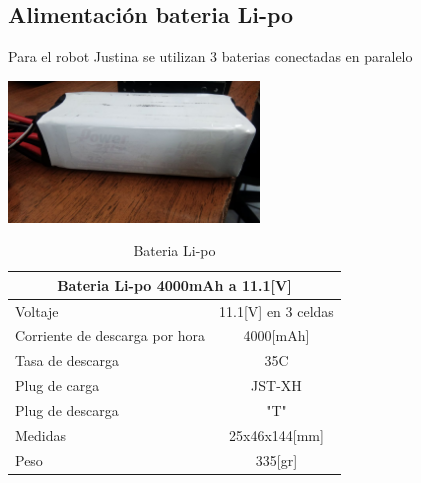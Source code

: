 \documentclass[a4paper]{book}
\begin{document}
\subsection{Alimentación bateria Li-po}

Para el robot Justina se utilizan 3 baterias conectadas en paralelo

\begin{center}
\includegraphics[width=0.5\textwidth]{Figures/Hardware/Partes/Li-po_Battery.jpg}
\label{fig:Hardware:Partes:Battery}
\end{center}

\begin{table}[H]
\begin{center}
\begin{tabular}{|l|l|}%

\hline
\multicolumn{2}{|c|}{Bateria Li-po 4000mAh a 11.1[V]} \\ \hline %
Voltaje &  \multicolumn{1}{|c|}{11.1[V] en 3 celdas}\\ \hline
Corriente de descarga por hora  & \multicolumn{1}{|c|}{4000[mAh]}\\ \hline
Tasa de descarga & \multicolumn{1}{|c|}{35C}\\ \hline
Plug de carga & \multicolumn{1}{|c|}{JST-XH}\\ \hline
Plug de descarga & \multicolumn{1}{|c|}{"T"}\\ \hline
Medidas & \multicolumn{1}{|c|}{25x46x144[mm]}\\ \hline
Peso & \multicolumn{1}{|c|}{335[gr]}\\ \hline

\end{tabular}
\caption{Bateria Li-po}
\label{Battery}
\end{center}
\end{table}
\end{document}
